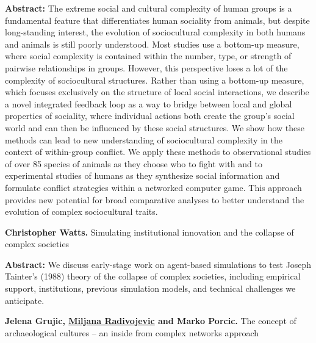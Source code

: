 \documentclass[]{article}
\begin{document}
\textbf{Abstract:} The extreme social and cultural complexity of human
groups is a fundamental feature that differentiates human sociality from
animals, but despite long-standing interest, the evolution of
sociocultural complexity in both humans and animals is still poorly
understood. Most studies use a bottom-up measure, where social
complexity is contained within the number, type, or strength of pairwise
relationships in groups. However, this perspective loses a lot of the
complexity of sociocultural structures. Rather than using a bottom-up
measure, which focuses exclusively on the structure of local social
interactions, we describe a novel integrated feedback loop as a way to
bridge between local and global properties of sociality, where
individual actions both create the group's social world and can then be
influenced by these social structures. We show how these methods can
lead to new understanding of sociocultural complexity in the context of
within-group conflict. We apply these methods to observational studies
of over 85 species of animals as they choose who to fight with and to
experimental studies of humans as they synthesize social information and
formulate conflict strategies within a networked computer game. This
approach provides new potential for broad comparative analyses to better
understand the evolution of complex sociocultural traits.

{\bf Christopher Watts. }{Simulating institutional innovation and the
collapse of complex societies}

\textbf{Abstract:} We discuss early-stage work on agent-based
simulations to test Joseph Tainter's (1988) theory of the collapse of
complex societies, including empirical support, institutions, previous
simulation models, and technical challenges we anticipate.

{\bf {Jelena Grujic, \href{http://www.mcdonald.cam.ac.uk/}{Miljana
Radivojevic} and Marko Porcic}. }{The concept of archaeological cultures
-- an inside from complex networks approach }
\end{document}
